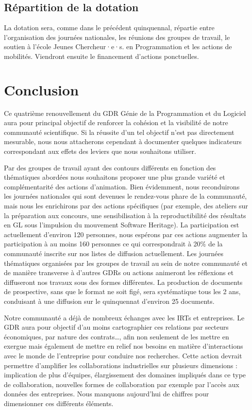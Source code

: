 \documentclass[11pt]{article}
\begin{document}
\subsection{Répartition de la dotation}

La dotation sera, comme dans le précédent quinquennal, répartie entre l'organisation des journées nationales, les réunions des groupes de travail, le soutien à l'école Jeunes Chercheur·e·s. en Programmation et les actions de mobilités. Viendront ensuite le financement d'actions ponctuelles.

\section{Conclusion}\label{conclusion}

Ce  quatrième renouvellement du GDR Génie de la Programmation et du Logiciel aura
pour principal objectif de renforcer la cohésion et la visibilité de notre communauté scientifique. 
Si la réussite d'un tel objectif n'est pas directement mesurable, nous nous attacherons cependant à documenter quelques indicateurs correspondant aux effets des leviers que nous souhaitons utiliser.

Par des groupes de travail ayant des contours différents en fonction des thématiques abordées nous souhaitons proposer une plus grande variété et complémentarité des actions d'animation. Bien évidemment, nous reconduirons les journées nationales qui sont devenues le rendez-vous phare de la communauté, mais nous les enrichirons par des actions spécifiques (par exemple, des ateliers sur la préparation aux concours, une sensibilisation à la reproductibilité des résultats en GL sous l'impulsion du mouvement Software Heritage). La participation est actuellement d’environ 120 personnes, nous espérons par ces actions augmenter la participation à au moins 160 personnes ce qui correspondrait à 20\% de la communauté inscrite sur nos listes de diffusion actuellement.
Les journées thématiques organisées par les groupes de travail au sein de notre communauté et de manière transverse à d'autres GDRs ou actions animeront les réflexions et diffuseront nos travaux sous des formes différentes. La production de documents de prospective, sans que le format ne soit figé, sera systématique tous les 2 ans, conduisant à une diffusion sur le quinquennat d'environ 25 documents.


Notre communauté a déjà de nombreux échanges avec les IRTs et entreprises. Le GDR aura pour objectif d'au moins cartographier ces relations par secteurs économiques, par nature des contrats\ldots, afin non seulement de les mettre en exergue mais également de mettre en relief nos besoins en matière d'interactions avec le monde de l'entreprise pour conduire nos recherches. Cette action devrait permettre d’amplifier les collaborations industrielles sur plusieurs dimensions : implication de plus d’équipes, élargissement des domaines impliqués dans ce type de collaboration, nouvelles formes de collaboration par exemple par l’accès aux données des entreprises. Nous manquons aujourd’hui de chiffres pour dimensionner ces différents éléments.
\end{document}
